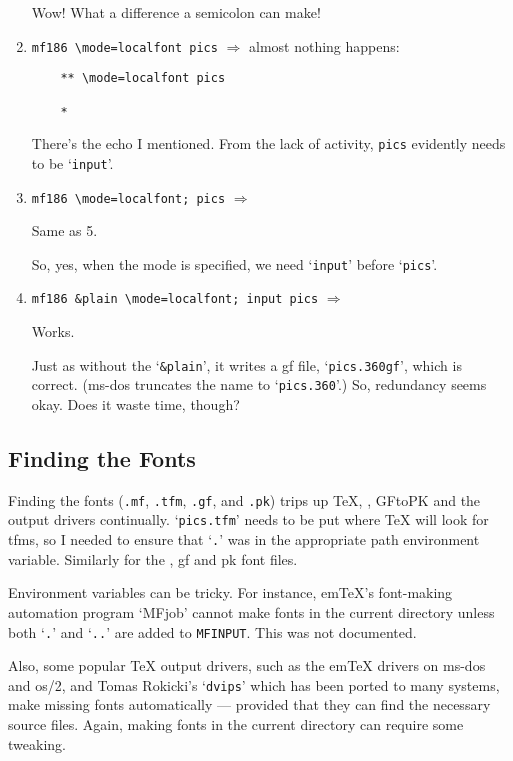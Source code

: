 \begin{enumerate}
Wow!  What a difference a semicolon can make!

\item \verb+mf186 \mode=localfont pics+  $\Longrightarrow$
  almost nothing happens:
\begin{verbatim}
    ** \mode=localfont pics

    *
\end{verbatim}

There's the echo I mentioned.  From the lack of activity, {\tt pics}
evidently needs to be `{\tt input}'.

\item  \verb+mf186 \mode=localfont; pics+  $\Longrightarrow$

    Same as 5.

So, yes, when the mode is specified, we need `{\tt input}'
before `{\tt pics}'.

\item  \verb+mf186 &plain \mode=localfont; input pics+  $\Longrightarrow$

    Works.

Just as without the `{\tt \&plain}', it writes a {\sc gf} file,
`{\tt pics.360gf}', which is correct.
({\sc ms-dos} truncates the name to `{\tt pics.360}'.)
So, redundancy seems okay.  Does it waste time, though?
\end{enumerate}


\subsection{Finding the Fonts}\label{sub:finding}

Finding the fonts ({\tt *.mf}, {\tt *.tfm}, {\tt *.gf}, and {\tt *.pk})
trips up \TeX{}, \MF{}, {\sf GFtoPK} and the output drivers continually.
`{\tt pics.tfm}' needs to be put where \TeX{} will look for {\sc tfm\/}s,
so I needed to ensure that `{\tt .}' was in the appropriate path environment
variable.  Similarly for the \MF{}, {\sc gf} and {\sc pk} font files.

Environment variables can be tricky.  For instance, em\TeX{}'s font-making
automation program `{\sf MFjob}' cannot make fonts in the current directory
unless both `{\tt .}' and `{\tt ..}' are added to {\tt MFINPUT}.
This was not documented.

Also, some popular \TeX{} output drivers, such as the em\TeX{} drivers
on {\sc ms-dos} and {\sc os/2}, and Tomas {\sc Rokicki\/}'s `{\tt dvips}'
which has been ported to many systems, make missing fonts automatically
--- provided that they can find the necessary \MF{} source files.
Again, making fonts in the current directory can require some
tweaking.



